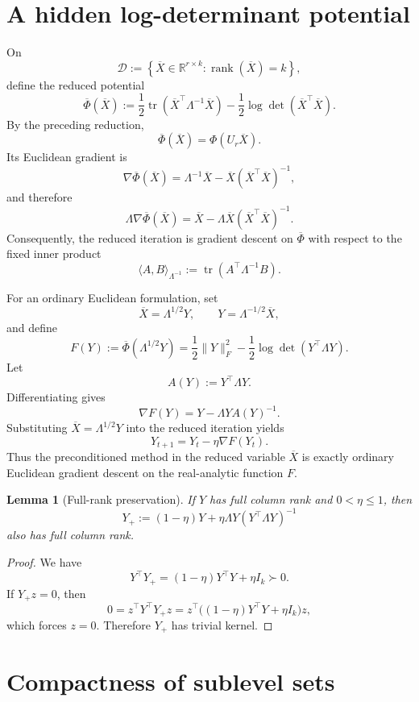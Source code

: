 \documentclass[11pt]{article}
\newcommand{\RR}{\mathbb{R}}
\newcommand{\rank}{\operatorname{rank}}
\newcommand{\tr}{\operatorname{tr}}
\newcommand{\cD}{\mathcal{D}}
\newtheorem{lemma}{Lemma}
\begin{document}
\section{A hidden log-determinant potential}

On
\[
\cD
:=
\left\{
\overline X\in\RR^{r\times k}:\rank(\overline X)=k
\right\},
\]
define the reduced potential
\[
\overline\Phi(\overline X)
:=
\frac12\tr(\overline X^\top\Lambda^{-1}\overline X)
-
\frac12\log\det(\overline X^\top\overline X).
\]
By the preceding reduction,
\[
\overline\Phi(\overline X)=\Phi(U_r\overline X).
\]
Its Euclidean gradient is
\[
\nabla\overline\Phi(\overline X)
=
\Lambda^{-1}\overline X
-
\overline X(\overline X^\top\overline X)^{-1},
\]
and therefore
\[
\Lambda\nabla\overline\Phi(\overline X)
=
\overline X
-
\Lambda\overline X(\overline X^\top\overline X)^{-1}.
\]
Consequently, the reduced iteration is gradient descent on
\(\overline\Phi\) with respect to the fixed inner product
\[
\langle A,B\rangle_{\Lambda^{-1}}
:=
\tr(A^\top\Lambda^{-1}B).
\]

For an ordinary Euclidean formulation, set
\[
\overline X=\Lambda^{1/2}Y,
\qquad
Y=\Lambda^{-1/2}\overline X,
\]
and define
\[
F(Y)
:=
\overline\Phi(\Lambda^{1/2}Y)
=
\frac12\|Y\|_F^2
-
\frac12\log\det(Y^\top\Lambda Y).
\tag{2}
\label{eq:F-def}
\]
Let
\[
A(Y):=Y^\top\Lambda Y.
\]
Differentiating gives
\[
\nabla F(Y)
=
Y-\Lambda YA(Y)^{-1}.
\tag{3}
\label{eq:F-grad}
\]
Substituting \(\overline X=\Lambda^{1/2}Y\) into the reduced iteration yields
\[
Y_{t+1}
=
Y_t-\eta\nabla F(Y_t).
\tag{4}
\label{eq:Y-update}
\]
Thus the preconditioned method in the reduced variable \(\overline X\) is
exactly ordinary Euclidean gradient descent on the real-analytic function
\(F\).

\begin{lemma}[Full-rank preservation]
\label{lem:rank-preservation}
If \(Y\) has full column rank and \(0<\eta\le1\), then
\[
Y_+
:=(1-\eta)Y+\eta\Lambda Y(Y^\top\Lambda Y)^{-1}
\]
also has full column rank.
\end{lemma}

\begin{proof}
We have
\[
Y^\top Y_+
=
(1-\eta)Y^\top Y+\eta I_k\succ0.
\]
If \(Y_+z=0\), then
\[
0
=
z^\top Y^\top Y_+z
=
z^\top\bigl((1-\eta)Y^\top Y+\eta I_k\bigr)z,
\]
which forces \(z=0\). Therefore \(Y_+\) has trivial kernel.
\end{proof}

\section{Compactness of sublevel sets}
\end{document}

